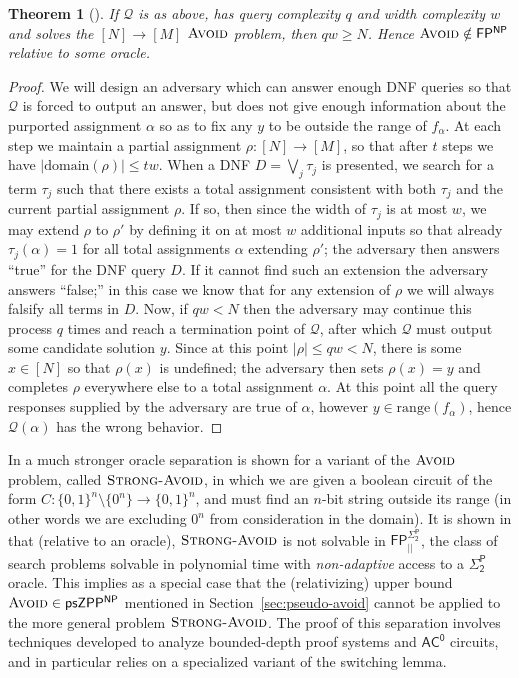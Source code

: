 \documentclass[11pt]{article}
\newtheorem{theorem}{Theorem}
\newcommand{\B}{\{0,1\}}
\newcommand{\avoid}{\textsc{Avoid}}
\begin{document}
\begin{theorem}[\cite{wilson}]\label{thm:wilson}
If $\mathcal{Q}$ is as above, has query complexity $q$ and width complexity $w$ and solves the $[N] \to [M]$ $\avoid$ problem, then $qw \geq N$. Hence $\avoid \notin \mathsf{FP^{NP}}$ relative to some oracle.
\end{theorem}
\begin{proof}
We will design an adversary which can answer enough DNF queries so that $\mathcal{Q}$ is forced to output an answer, but does not give enough information about the purported assignment $\alpha$ so as to fix any $y$ to be outside the range of $f_{\alpha}$. At each step we maintain a partial assignment $\rho : [N] \to [M]$, so that after $t$ steps we have $|\mathrm{domain}(\rho)| \leq t w$. When a DNF $D = \bigvee_j \tau_j$ is presented, we search for a term $\tau_j$ such that there exists a total assignment consistent with both $\tau_j$ and the current partial assignment $\rho$. If so, then since the width of $\tau_j$ is at most $w$, we may extend $\rho$ to $\rho'$ by defining it on at most $w$ additional inputs so that already $\tau_j(\alpha)= 1$ for all total assignments $\alpha$ extending $\rho'$; the adversary then answers ``true'' for the DNF query $D$. If it cannot find such an extension the adversary answers ``false;'' in this case we know that for any extension of $\rho$ we will always falsify all terms in $D$. Now, if $qw < N$ then the adversary may continue this process $q$ times and reach a termination point of $\mathcal{Q}$, after which $\mathcal{Q}$ must output some candidate solution $y$. Since at this point $|\rho| \leq qw < N$, there is some $x \in [N]$ so that $\rho(x)$ is undefined; the adversary then sets $\rho(x)=y$ and completes $\rho$ everywhere else to a total assignment $\alpha$. At this point all the query responses supplied by the adversary are true of $\alpha$, however $y \in \mathrm{range}(f_\alpha)$, hence $\mathcal{Q}(\alpha)$ has the wrong behavior.
\end{proof}

In \cite{toni} a much stronger oracle separation is shown for a variant of the $\avoid$ problem, called $\textsc{Strong-Avoid}$, in which we are given a boolean circuit of the form $C: \B^n\setminus \{0^n\} \to \B^n$, and must find an $n$-bit string outside its range (in other words we are excluding $0^n$ from consideration in the domain). It is shown in \cite{toni} that (relative to an oracle), $\textsc{Strong-Avoid}$ is not solvable in $\mathsf{FP^{\Sigma_2^P}_{||}}$, the class of search problems solvable in polynomial time with \emph{non-adaptive} access to a $\mathsf{\Sigma_2^P}$ oracle. This implies as a special case that the (relativizing) upper bound $\avoid \in \mathsf{psZPP^{NP}}$ mentioned in Section~\ref{sec:pseudo-avoid} cannot be applied to the more general problem $\textsc{Strong-Avoid}$. The proof of this separation involves techniques developed to analyze bounded-depth proof systems and $\mathsf{AC^0}$ circuits, and in particular relies on a specialized variant of the switching lemma.
\end{document}
